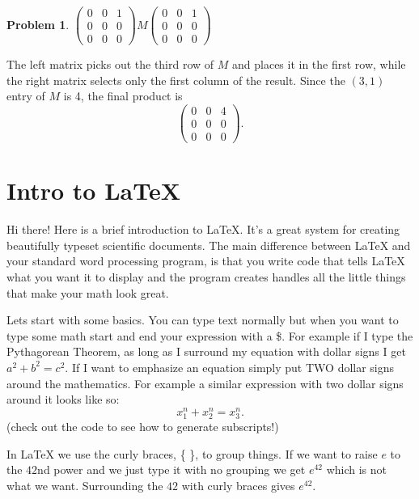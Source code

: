\documentclass[12pt]{article}
\newenvironment{answer}
    {\begin{adjustwidth}{0pt}{0pt}}
    {\end{adjustwidth}}
\newtheorem{problem}{Problem}
\theoremstyle{remark}  %
\begin{document}
\begin{problem}
$
\begin{pmatrix}
0 & 0 & 1 \\
0 & 0 & 0 \\
0 & 0 & 0
\end{pmatrix}
M
\begin{pmatrix}
0 & 0 & 1 \\
0 & 0 & 0 \\
0 & 0 & 0
\end{pmatrix}
$
\end{problem}
\begin{answer}
The left matrix picks out the third row of \(M\) and places it in the first row, while the right matrix selects only the first column of the result. Since the \((3,1)\) entry of \(M\) is 4, the final product is
\[
\begin{pmatrix}
0 & 0 & 4 \\
0 & 0 & 0 \\
0 & 0 & 0
\end{pmatrix}.
\]
\end{answer}

\iffalse


\section{Intro to LaTeX}
Hi there! Here is a brief introduction to LaTeX. It's a great system for creating beautifully typeset scientific documents. The main difference between LaTeX and your standard word processing program, is that you write code that tells LaTeX what you want it to display and the program creates handles all the little things that make your math look great.

Lets start with some basics. You can type text normally but when you want to type some math start and end your expression with a \$. For example if I type the Pythagorean Theorem, as long as I surround my equation with dollar signs I get $a^2 +b^2 = c^2$. If I want to emphasize an equation simply put TWO dollar signs around the mathematics. For example a similar expression with two dollar signs around it looks like so: $$x_1^n + x_2^n = x_3^n.$$ (check out the code to see how to generate subscripts!)

In LaTeX we use the curly braces, \{ \}, to group things. If we want to raise $e$ to the $42$nd power and we just type it with no grouping we get $e^42$ which is not what we want. Surrounding the $42$ with curly braces gives $e^{42}$.
\end{document}
